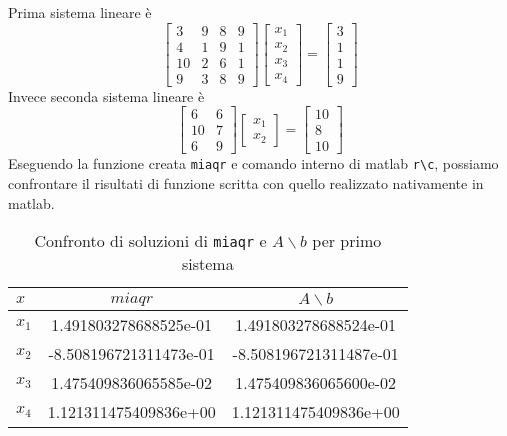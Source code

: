Prima sistema lineare è
\[
   \begin{bmatrix}
      3  & 9 & 8 & 9 \\
      4  & 1 & 9 & 1 \\
      10 & 2 & 6 & 1 \\
      9  & 3 & 8 & 9
   \end{bmatrix}
   \begin{bmatrix}
      x_{1} \\
      x_{2} \\
      x_{3} \\
      x_{4}
   \end{bmatrix}
   =
   \begin{bmatrix}
      3 \\
      1 \\
      1 \\
      9
   \end{bmatrix}
\]
Invece seconda sistema lineare è
\[
   \begin{bmatrix}
      6  & 6 \\
      10 & 7 \\
      6  & 9
   \end{bmatrix}
   \begin{bmatrix}
      x_{1} \\
      x_{2}
   \end{bmatrix}
   =
   \begin{bmatrix}
      10 \\
      8  \\
      10
   \end{bmatrix}
\]
Eseguendo la funzione creata \lstinline{miaqr} e comando interno di
matlab \lstinline{r\c}, possiamo confrontare il risultati di funzione
scritta con quello realizzato nativamente in matlab.
\begin{table}[ht]
   \centering
   \renewcommand\arraystretch{2}
   \begin{tabular}{|l | c c |}
      \hline
      $x$     & $miaqr$                & $A \backslash b$       \\
      \hline
      $x_{1}$ & 1.491803278688525e-01  & 1.491803278688524e-01  \\
      $x_{2}$ & -8.508196721311473e-01 & -8.508196721311487e-01 \\
      $x_{3}$ & 1.475409836065585e-02  & 1.475409836065600e-02  \\
      $x_{4}$ & 1.121311475409836e+00  & 1.121311475409836e+00  \\
      \hline
   \end{tabular}
   \caption{Confronto di soluzioni di \lstinline{miaqr} e $A \backslash b$ per primo sistema}
   \label{tab:12_1}
\end{table}
